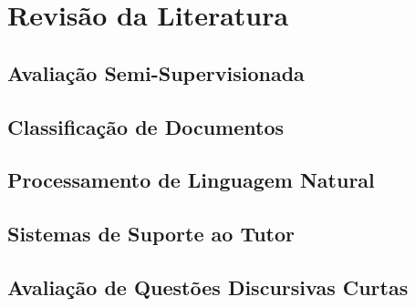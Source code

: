 \chapter{Revisão da Literatura}
\label{cap-literatura}

\section{Avaliação Semi-Supervisionada}

\section{Classificação de Documentos}

\section{Processamento de Linguagem Natural}

\section{Sistemas de Suporte ao Tutor}

\section{Avaliação de Questões Discursivas Curtas}